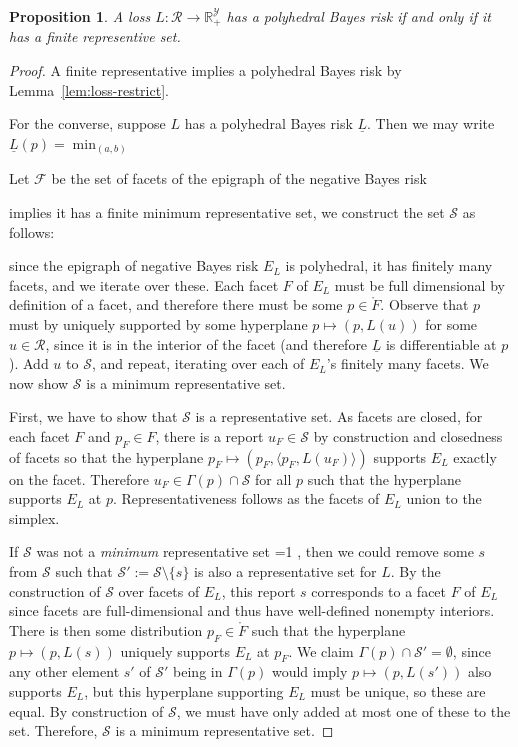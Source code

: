 \documentclass[11pt]{article}
\newcommand{\Comments}{1}
\newcommand{\mynote}[2]{\ifnum\Comments=1\textcolor{#1}{#2}\fi}
\newcommand{\mytodo}[2]{\ifnum\Comments=1%
  \todo[linecolor=#1!80!black,backgroundcolor=#1,bordercolor=#1!80!black]{#2}\fi}
\newcommand{\raft}[1]{\mytodo{green!20!white}{RF: #1}}
\newcommand{\jessie}[1]{\mynote{teal}{[JF: #1]}}
\newcommand{\jessiet}[1]{\mytodo{teal!20!white}{JF: #1}}
\newcommand{\reals}{\mathbb{R}}
\newcommand{\F}{\mathcal{F}}
\newcommand{\R}{\mathcal{R}}
\newcommand{\Sc}{\mathcal{S}}
\newcommand{\Y}{\mathcal{Y}}
\newcommand{\risk}[1]{\underline{#1}}
\newcommand{\inprod}[2]{\langle #1, #2 \rangle}%
\newcommand{\inter}[1]{\mathring{#1}}%
\newtheorem{proposition}{Proposition}
\begin{document}
\begin{proposition}\label{prop:SL-minimum}
  A loss $L: \R \to \reals^\Y_+$ has a polyhedral Bayes risk if and only if it has a finite representive set.
\end{proposition}
\begin{proof}
  A finite representative implies a polyhedral Bayes risk by Lemma~\ref{lem:loss-restrict}.
  
  For the converse, suppose $L$ has a polyhedral Bayes risk $\risk{L}$.
  Then we may write $\risk{L}(p) = \min_{(a,b)}$
  
  Let $\F$ be the set of facets of the epigraph of the negative Bayes risk

  implies it has a finite minimum representative set, we construct the set $\Sc$ as follows:

  since the epigraph of negative Bayes risk $E_L$ is polyhedral, it has finitely many facets, and we iterate over these.
  Each facet $F$ of $E_L$ must be full dimensional by definition of a facet, and therefore there must be some $p \in \inter{F}$.
  Observe that $p$ must by uniquely supported by some hyperplane $p \mapsto (p, L(u))$ for some $u \in \R$, since it is in the interior of the facet (and therefore $\risk{L}$ is differentiable at $p$).
  Add $u$ to $\Sc$, and repeat, iterating over each of $E_L$'s finitely many facets.
  We now show $\Sc$ is a minimum representative set.
  
  First, we have to show that $\Sc$ is a representative set.
  As facets are closed, for each facet $F$ and $p_F \in F$, there is a report $u_F \in \Sc$ by construction and closedness of facets so that the hyperplane $p_F \mapsto (p_F, \inprod{p_F}{L(u_F)})$ supports $E_L$ exactly on the facet. Therefore $u_F \in \Gamma(p) \cap \Sc$ for all $p$ such that the hyperplane supports $E_L$ at $p$.
  Representativeness follows as the facets of $E_L$ union to the simplex.
  
  If $\Sc$ was not a \emph{minimum} representative set \jessiet{minimal proof, not minimum}, then we could remove some $s$ from $\Sc$ such that $\Sc' := \Sc \setminus \{s\}$ is also a representative set for $L$.
  By the construction of $\Sc$ over facets of $E_L$, this report $s$ corresponds to a facet $F$ of $E_L$ since facets are full-dimensional and thus have well-defined nonempty interiors.
  There is then some distribution $p_F \in \inter F$ such that the hyperplane $p \mapsto (p, L(s))$ uniquely supports $E_L$ at $p_F$.
  We claim $\Gamma(p) \cap \Sc' = \emptyset$, since any other element $s'$ of $\Sc'$ being in $\Gamma(p)$ would imply $p \mapsto (p, L(s'))$ also supports $E_L$, but this hyperplane supporting $E_L$ must be unique, so these are equal.
  By construction of $\Sc$, we must have only added at most one of these to the set.
  Therefore, $\Sc$ is a minimum representative set.
  

\end{proof}
\end{document}
